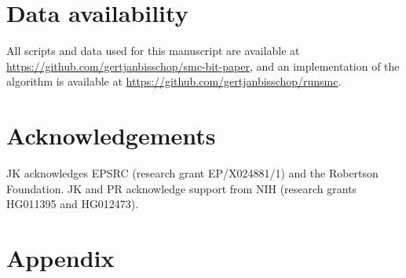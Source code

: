 \documentclass{article}
\newcommand{\tsinfer}[0]{\texttt{tsinfer}}
\newcommand{\argneedle}[0]{\texttt{ARG-Needle}}
\newcommand{\relate}[0]{\texttt{Relate}}
\begin{document}




\section*{Data availability}

All scripts and data used for this manuscript are available at
\url{https://github.com/gertjanbisschop/smc-bit-paper},
and an implementation of the algorithm is available at
\url{https://github.com/gertjanbisschop/runsmc}.

\section*{Acknowledgements}
JK acknowledges EPSRC (research grant EP/X024881/1)
and the Robertson Foundation.
JK and PR acknowledge support from
NIH (research grants HG011395 and HG012473).

\FloatBarrier



\setcounter{secnumdepth}{2} %

\section*{Appendix}
\appendix
\end{document}
